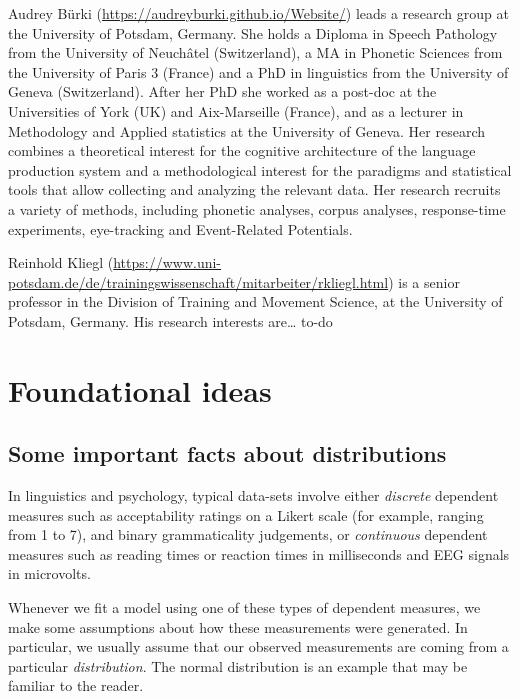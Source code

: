 \documentclass[12pt,]{krantz}
\begin{document}
Audrey Bürki (\url{https://audreyburki.github.io/Website/}) leads a research group at the University of Potsdam, Germany. She holds a Diploma in Speech Pathology from the University of Neuchâtel (Switzerland), a MA in Phonetic Sciences from the University of Paris 3 (France) and a PhD in linguistics from the University of Geneva (Switzerland). After her PhD she worked as a post-doc at the Universities of York (UK) and Aix-Marseille (France), and as a lecturer in Methodology and Applied statistics at the University of Geneva. Her research combines a theoretical interest for the cognitive architecture of the language production system and a methodological interest for the paradigms and statistical tools that allow collecting and analyzing the relevant data. Her research recruits a variety of methods, including phonetic analyses, corpus analyses, response-time experiments, eye-tracking and Event-Related Potentials.

Reinhold Kliegl (\url{https://www.uni-potsdam.de/de/trainingswissenschaft/mitarbeiter/rkliegl.html}) is a senior professor in the Division of Training and Movement Science, at the University of Potsdam, Germany. His research interests are\ldots{} to-do

\mainmatter

\hypertarget{part-foundational-ideas}{%
\part{Foundational ideas}\label{part-foundational-ideas}}

\hypertarget{some-important-facts-about-distributions}{%
\chapter{Some important facts about distributions}\label{some-important-facts-about-distributions}}

In linguistics and psychology, typical data-sets involve either \emph{discrete} dependent measures such as acceptability ratings on a Likert scale (for example, ranging from 1 to 7), and binary grammaticality judgements, or \emph{continuous} dependent measures such as reading times or reaction times in milliseconds and EEG signals in microvolts.

Whenever we fit a model using one of these types of dependent measures, we make some assumptions about how these measurements were generated. In particular, we usually assume that our observed measurements are coming from a particular \emph{distribution}. The normal distribution is an example that may be familiar to the reader.
\end{document}
